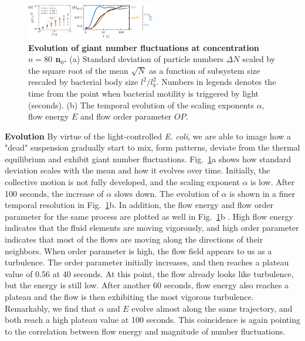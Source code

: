 \documentclass[twocolumn,aps,pre,amsmath,amssymb,longbibliography]{revtex4-1}
\begin{document}
\begin{figure}[h]
\begin{center}
\includegraphics[width=0.5\textwidth]{GNF_figure-4-v1.png}
\caption[]{\textbf{Evolution of giant number fluctuations at concentration $n=80$ n$_0$.} (a) Standard deviation of particle numbers $\Delta N$ scaled by the square root of the mean $\sqrt N$ as a function of subsystem size rescaled by bacterial body size $l^2/l_b^2$. Numbers in legends denotes the time from the point when bacterial motility is triggered by light (seconds). (b) The temporal evolution of the scaling exponents $\alpha$, flow energy $E$ and flow order parameter $OP$.}
\label{fig:4}
\end{center}
\end{figure}

\textbf{Evolution} By virtue of the light-controlled \textit{E. coli}, we are able to image how a "dead" suspension gradually start to mix, form patterns, deviate from the thermal equilibrium and exhibit giant number fluctuations. Fig.~\ref{fig:4}a shows how standard deviation scales with the mean and how it evolves over time. Initially, the collective motion is not fully developed, and the scaling exponent $\alpha$ is low. After 100 seconds, the increase of $\alpha$ slows down. The evolution of $\alpha$ is shown in a finer temporal resolution in Fig.~\ref{fig:4}b. In addition, the flow energy and flow order parameter for the same process are plotted as well in Fig.~\ref{fig:4}b \cite{Peng2020}. High flow energy indicates that the fluid elements are moving vigorously, and high order parameter indicates that most of the flows are moving along the directions of their neighbors. When order parameter is high, the flow field appears to us as a turbulence. The order parameter initially increases, and then reaches a plateau value of 0.56 at 40 seconds. At this point, the flow already looks like turbulence, but the energy is still low. After another 60 seconds, flow energy also reaches a plateau and the flow is then exhibiting the most vigorous turbulence. Remarkably, we find that $\alpha$ and $E$ evolve almost along the same trajectory, and both reach a high plateau value at 100 seconds. This coincidence is again pointing to the correlation between flow energy and magnitude of number fluctuations.
\end{document}
